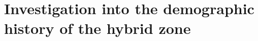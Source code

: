 \documentclass[a4paper,12pt,times,print,index,custombib,custommargin]{PhDThesisPSnPDF}\usepackage[]{graphicx}\usepackage[]{color}
\begin{document}
\tableofcontents

\listoffigures


\listoftodos

\printglossaries


\ifpdf
    \graphicspath{
    {./Figs/Raster/}
    {./Figs/PDF/}
    {./Figs/}
    {../Data_analysis/reference-mapping/figure/}
    }
\else
    \graphicspath{ 
    {./Figs/Vector/}
    {./Figs/}
    }
\fi

%
%
%
\chapter{Investigation into the demographic history of the hybrid zone}
%
%
%
\end{document}
